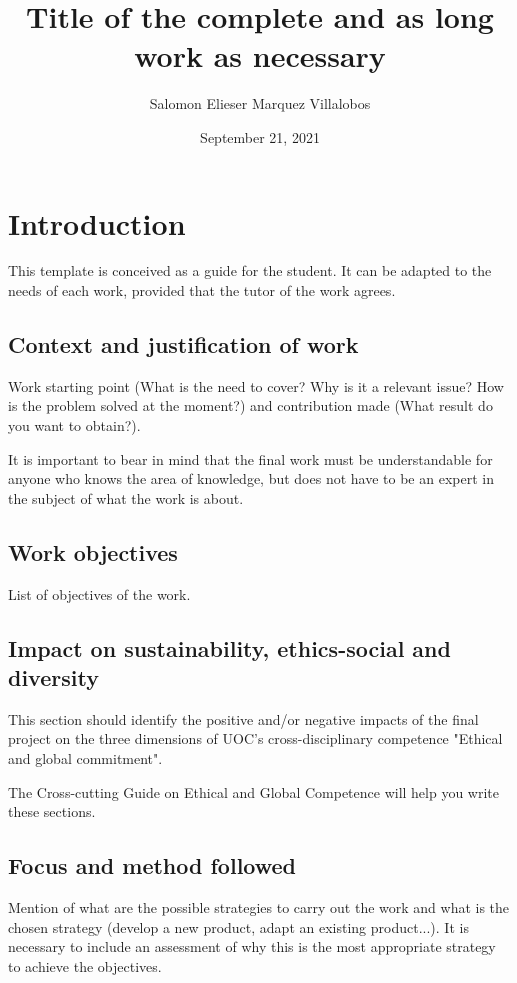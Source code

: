 \documentclass[ENG]{TFUOC}%
\title{Title of the complete and as long work as necessary}
\author{Salomon Elieser Marquez Villalobos}
\date{September 21, 2021}
\begin{document}
\estructura

\tableofcontents

\listoffigures

\listoftables




\chapter{Introduction}

This template is conceived as a guide for the student. It can be adapted to the needs of each work, provided that the tutor of the work agrees.

\section{Context and justification of work}


Work starting point (What is the need to cover? Why is it a relevant issue? How is the problem solved at the moment?) and contribution made (What result do you want to obtain?).

It is important to bear in mind that the final work must be understandable for anyone who knows the area of knowledge, but does not have to be an expert in the subject of what the work is about.

\section{Work objectives}

List of objectives of the work.

\section{Impact on sustainability, ethics-social and diversity}
\label{s:etic}

This section should identify the positive and/or negative impacts of the final project on the three dimensions of UOC's cross-disciplinary competence "Ethical and global commitment".
 
The Cross-cutting Guide on Ethical and Global Competence will help you write these sections.


\section{Focus and method followed}

Mention of what are the possible strategies to carry out the work and what is the chosen strategy (develop a new product, adapt an existing product...). It is necessary to include an assessment of why this is the most appropriate strategy to achieve the objectives.   	
\end{document}
